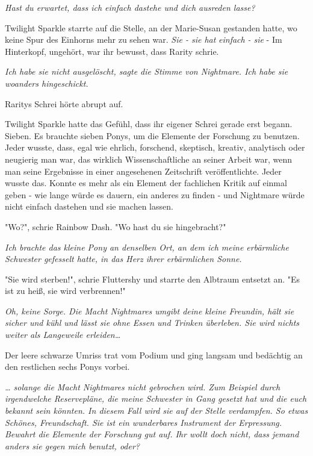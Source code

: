 {\emph{Hast du erwartet, dass ich einfach dastehe und dich ausreden lasse?}

Twilight Sparkle starrte auf die Stelle, an der Marie-Susan gestanden hatte, wo keine Spur des Einhorns mehr zu sehen war. \emph{Sie - sie hat} \emph{einfach} \emph{- sie} - Im Hinterkopf, ungehört, war ihr bewusst, dass Rarity schrie.

\emph{\emph{Ich habe sie nicht ausgelöscht}, sagte die Stimme von Nightmare. \emph{Ich habe sie woanders hingeschickt.}}

Raritys Schrei hörte abrupt auf.

Twilight Sparkle hatte das Gefühl, dass ihr eigener Schrei gerade erst begann. Sieben. Es brauchte sieben Ponys, um die Elemente der Forschung zu benutzen. Jeder wusste, dass, egal wie ehrlich, forschend, skeptisch, kreativ, analytisch oder neugierig man war, das wirklich Wissenschaftliche an seiner Arbeit war, wenn man seine Ergebnisse in einer angesehenen Zeitschrift veröffentlichte. Jeder wusste das. Konnte es mehr als ein Element der fachlichen Kritik auf einmal geben - wie lange würde es dauern, ein anderes zu finden - und Nightmare würde nicht einfach dastehen und sie machen lassen.

"Wo?", schrie Rainbow Dash. "Wo hast du sie hingebracht?"

\emph{Ich brachte das kleine Pony an denselben Ort, an dem ich meine erbärmliche Schwester gefesselt hatte, in das Herz ihrer erbärmlichen Sonne.}

"Sie wird sterben!", schrie Fluttershy und starrte den Albtraum entsetzt an. "Es ist zu heiß, sie wird verbrennen!"

\emph{\emph{Oh, keine Sorge. Die Macht} \emph{Nightmares} \emph{umgibt deine kleine Freundin, hält sie sicher und kühl und lässt sie ohne Essen und Trinken überleben. Sie wird nichts weiter als Langeweile erleiden…}}

Der leere schwarze Umriss trat vom Podium und ging langsam und bedächtig an den restlichen sechs Ponys vorbei.

\emph{\emph{… solange die Macht} \emph{Nightmares} \emph{nicht gebrochen wird. Zum Beispiel durch irgendwelche Reservepläne, die meine Schwester in Gang gesetzt hat und die euch bekannt sein könnten. In diesem Fall wird sie auf der Stelle verdampfen. So etwas Schönes, Freundschaft. Sie ist ein wunderbares Instrument der Erpressung. Bewahrt die Elemente der Forschung gut auf. Ihr wollt doch nicht, dass jemand anders sie gegen mich benutzt, oder?}}

}
